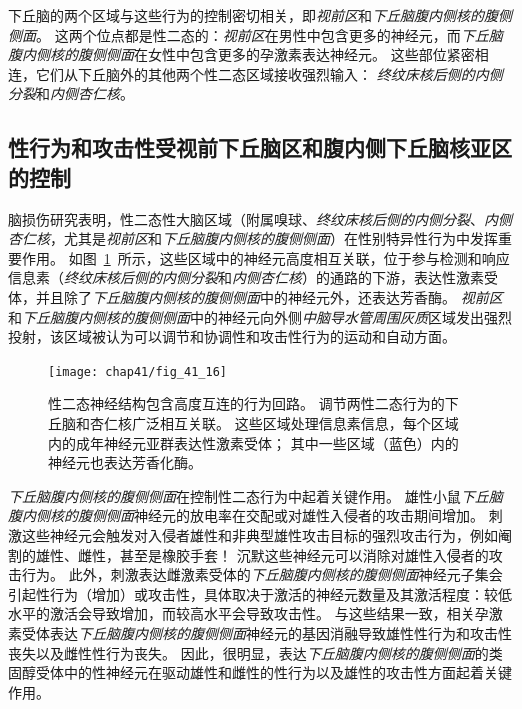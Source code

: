 下丘脑的两个区域与这些行为的控制密切相关，即\textit{视前区}和\textit{下丘脑腹内侧核的腹侧侧面}。
这两个位点都是性二态的：\textit{视前区}在男性中包含更多的神经元，而\textit{下丘脑腹内侧核的腹侧侧面}在女性中包含更多的孕激素表达神经元。
这些部位紧密相连，它们从下丘脑外的其他两个性二态区域接收强烈输入：
\textit{终纹床核后侧的内侧分裂}和\textit{内侧杏仁核}。



\subsection{性行为和攻击性受视前下丘脑区和腹内侧下丘脑核亚区的控制}

脑损伤研究表明，性二态性大脑区域（附属嗅球、\textit{终纹床核后侧的内侧分裂}、\textit{内侧杏仁核}，尤其是\textit{视前区}和\textit{下丘脑腹内侧核的腹侧侧面}）在性别特异性行为中发挥重要作用。
如图~\ref{fig:41_16}~所示，这些区域中的神经元高度相互关联，位于参与检测和响应信息素（\textit{终纹床核后侧的内侧分裂}和\textit{内侧杏仁核}）的通路的下游，表达性激素受体，并且除了\textit{下丘脑腹内侧核的腹侧侧面}中的神经元外，还表达芳香酶。
\textit{视前区}和\textit{下丘脑腹内侧核的腹侧侧面}中的神经元向外侧\textit{中脑导水管周围灰质}区域发出强烈投射，该区域被认为可以调节和协调性和攻击性行为的运动和自动方面。


\begin{figure}[htbp]
	\centering
	\texttt{[image: chap41/fig\_41\_16]}
	\caption{性二态神经结构包含高度互连的行为回路。
		调节两性二态行为的下丘脑和杏仁核广泛相互关联。
		这些区域处理信息素信息，每个区域内的成年神经元亚群表达性激素受体；
		其中一些区域（蓝色）内的神经元也表达芳香化酶。}
	\label{fig:41_16}
\end{figure}


\textit{下丘脑腹内侧核的腹侧侧面}在控制性二态行为中起着关键作用。
雄性小鼠\textit{下丘脑腹内侧核的腹侧侧面}神经元的放电率在交配或对雄性入侵者的攻击期间增加。
刺激这些神经元会触发对入侵者雄性和非典型雄性攻击目标的强烈攻击行为，例如阉割的雄性、雌性，甚至是橡胶手套！
沉默这些神经元可以消除对雄性入侵者的攻击行为。
此外，刺激表达雌激素受体的\textit{下丘脑腹内侧核的腹侧侧面}神经元子集会引起性行为（增加）或攻击性，具体取决于激活的神经元数量及其激活程度：较低水平的激活会导致增加，而较高水平会导致攻击性。
与这些结果一致，相关孕激素受体表达\textit{下丘脑腹内侧核的腹侧侧面}神经元的基因消融导致雄性性行为和攻击性丧失以及雌性性行为丧失。
因此，很明显，表达\textit{下丘脑腹内侧核的腹侧侧面}的类固醇受体中的性神经元在驱动雄性和雌性的性行为以及雄性的攻击性方面起着关键作用。



